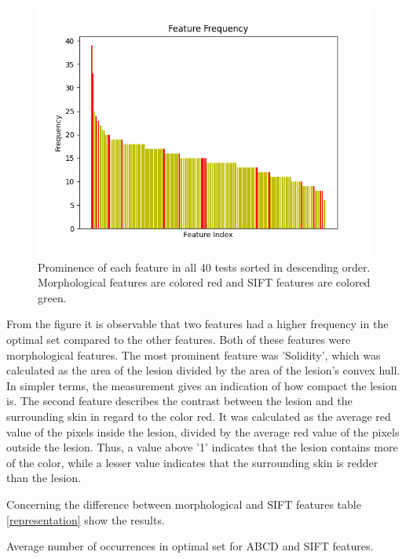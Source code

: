 \documentclass{kththesis}
\begin{document}

\begin{figure}[h!]
  \centering
  \includegraphics[scale=0.8]{./figures/Figure_all_fres.png}
  \caption{Prominence of each feature in all 40 tests sorted in descending order. Morphological features are colored red and SIFT features are colored green.}
  \label{fig:all_freq}
\end{figure}

\newpage

From the figure it is observable that two features had a higher frequency in the optimal set compared to the other features. Both of these features were morphological features. The most prominent feature was 'Solidity', which was calculated as the area of the lesion divided by the area of the lesion's convex hull. In simpler terms, the measurement gives an indication of how compact the lesion is. The second feature describes the contrast between the lesion and the surrounding skin in regard to the color red. It was calculated as the average red value of the pixels inside the lesion, divided by the average red value of the pixels outside the lesion. Thus, a value above '1' indicates that the lesion contains more of the color, while a lesser value indicates that the surrounding skin is redder than the lesion.

Concerning the difference between morphological and SIFT features table \ref{representation} show the results. 

\begin{table}[h!]
  \caption{Average number of occurrences in optimal set for ABCD and SIFT features.}
  \label{representation}
\end{table}
\end{document}
